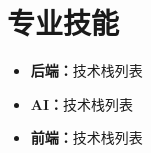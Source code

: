 \documentclass[11pt, a4paper]{ctexart}
\begin{document}
\section{专业技能}
\begin{itemize}[label={}]
    \item \textbf{后端：}技术栈列表
    \item \textbf{AI：}技术栈列表
    \item \textbf{前端：}技术栈列表
\end{itemize}
\end{document}
